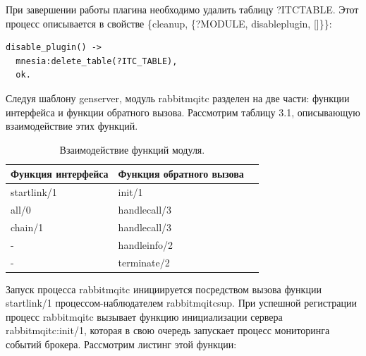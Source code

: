 При завершении работы плагина необходимо удалить таблицу ?ITC\underline{\hspace{0.25cm}}TABLE. Этот процесс описывается в свойстве  \{cleanup, \{?MODULE, disable\underline{\hspace{0.25cm}}plugin, []\}\}:
\begin{lstlisting}
disable_plugin() ->
  mnesia:delete_table(?ITC_TABLE),
  ok.
\end{lstlisting}\par
Следуя шаблону gen\underline{\hspace{0.25cm}}server, модуль rabbitmq\underline{\hspace{0.25cm}}itc разделен на две части: функции интерфейса и функции обратного вызова. Рассмотрим таблицу 3.1, описывающую взаимодействие этих функций.
\begin{table}
\centering
\caption{\label{tab:widgets} Взаимодействие функций модуля.}
\begin{tabular}{llr}
\cmidrule(r){1-2}
Функция интерфейса  & Функция обратного вызова   \\
\midrule
start\underline{\hspace{0.25cm}}link/1      & init/1   \\
all/0   & handle\underline{\hspace{0.25cm}}call/3\\
chain/1 &handle\underline{\hspace{0.25cm}}call/3\\
- & handle\underline{\hspace{0.25cm}}info/2\\
- & terminate/2\\
\bottomrule
\end{tabular}
\end{table}
Запуск процесса rabbitmq\underline{\hspace{0.25cm}}itc инициируется посредством вызова функции start\underline{\hspace{0.25cm}}link/1 процессом-наблюдателем rabbitmq\underline{\hspace{0.25cm}}itc\underline{\hspace{0.25cm}}sup. При успешной регистрации процесс rabbitmq\underline{\hspace{0.25cm}}itc вызывает функцию инициализации сервера rabbitmq\underline{\hspace{0.25cm}}itc:init/1, которая в свою очередь запускает процесс мониторинга событий брокера. Рассмотрим листинг этой функции: 
